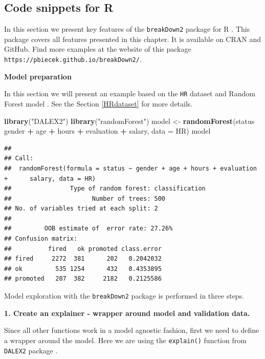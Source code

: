 \documentclass[]{krantz}
\newenvironment{Shaded}{\begin{snugshade}}{\end{snugshade}}
\newcommand{\DataTypeTok}[1]{\textcolor[rgb]{0.13,0.29,0.53}{#1}}
\newcommand{\KeywordTok}[1]{\textcolor[rgb]{0.13,0.29,0.53}{\textbf{#1}}}
\newcommand{\NormalTok}[1]{#1}
\newcommand{\OperatorTok}[1]{\textcolor[rgb]{0.81,0.36,0.00}{\textbf{#1}}}
\newcommand{\StringTok}[1]{\textcolor[rgb]{0.31,0.60,0.02}{#1}}
\theoremstyle{definition}
\theoremstyle{definition}
\theoremstyle{definition}
\theoremstyle{remark}
\begin{document}
\hypertarget{code-snippets-for-r-1}{%
\subsection{Code snippets for R}\label{code-snippets-for-r-1}}

In this section we present key features of the \texttt{breakDown2}
package for R \citep{R-breakDown}. This package covers all features
presented in this chapter. It is available on CRAN and GitHub. Find more
examples at the website of this package
\texttt{https://pbiecek.github.io/breakDown2/}.

\textbf{Model preparation}

In this section we will present an example based on the \texttt{HR}
dataset and Random Forest model \citep{R-randomForest}. See the Section
\ref{HRdataset} for more details.

\begin{Shaded}
\begin{Highlighting}[]
\KeywordTok{library}\NormalTok{(}\StringTok{"DALEX2"}\NormalTok{)}
\KeywordTok{library}\NormalTok{(}\StringTok{"randomForest"}\NormalTok{)}
\NormalTok{model <-}\StringTok{ }\KeywordTok{randomForest}\NormalTok{(status }\OperatorTok{~}\StringTok{ }\NormalTok{gender }\OperatorTok{+}\StringTok{ }\NormalTok{age }\OperatorTok{+}\StringTok{ }\NormalTok{hours }\OperatorTok{+}\StringTok{ }\NormalTok{evaluation }\OperatorTok{+}\StringTok{ }\NormalTok{salary, }\DataTypeTok{data =}\NormalTok{ HR)}
\NormalTok{model}
\end{Highlighting}
\end{Shaded}

\begin{verbatim}
## 
## Call:
##  randomForest(formula = status ~ gender + age + hours + evaluation +      salary, data = HR) 
##                Type of random forest: classification
##                      Number of trees: 500
## No. of variables tried at each split: 2
## 
##         OOB estimate of  error rate: 27.26%
## Confusion matrix:
##          fired   ok promoted class.error
## fired     2272  381      202   0.2042032
## ok         535 1254      432   0.4353895
## promoted   207  382     2182   0.2125586
\end{verbatim}

Model exploration with the \texttt{breakDown2} package is performed in
three steps.

\textbf{1. Create an explainer - wrapper around model and validation
data.}

Since all other functions work in a model agnostic fashion, first we
need to define a wrapper around the model. Here we are using the
\texttt{explain()} function from \texttt{DALEX2} package
\citep{R-DALEX}.
\end{document}
